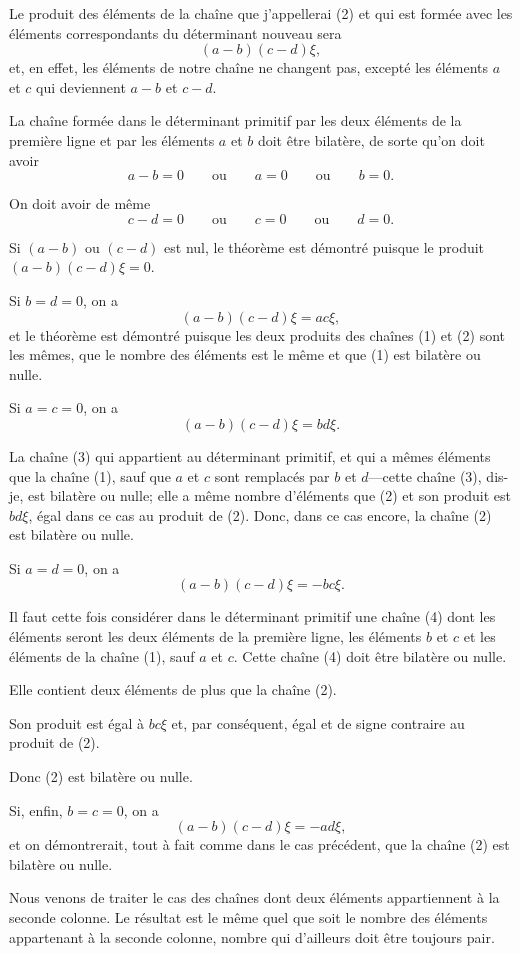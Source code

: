 \documentclass{article}
\begin{document}
Le produit des éléments de la chaîne que j'appellerai (2) et qui est formée avec les éléments correspondants du déterminant nouveau sera
\[ (a-b)(c-d)\xi, \]
et, en effet, les éléments de notre chaîne ne changent pas, excepté les éléments $a$ et $c$ qui deviennent $a-b$ et $c-d$.

La chaîne formée dans le déterminant primitif par les deux éléments de la première ligne et par les éléments $a$ et $b$ doit être bilatère, de sorte qu'on doit avoir
\[ a-b = 0 \qquad \text{ou} \qquad a = 0 \qquad \text{ou} \qquad b = 0. \]

On doit avoir de même
\[ c-d = 0 \qquad \text{ou} \qquad c = 0 \qquad \text{ou} \qquad d = 0. \]

Si $(a-b)$ ou $(c-d)$ est nul, le théorème est démontré puisque le produit $(a-b)(c-d)\xi = 0$.

Si $b = d = 0$, on a
\[ (a-b)(c-d)\xi = ac\xi, \]
et le théorème est démontré puisque les deux produits des chaînes (1) et (2) sont les mêmes, que le nombre des éléments est le même et que (1) est bilatère ou nulle.

Si $a = c = 0$, on a
\[ (a-b)(c-d)\xi = bd\xi. \]

La chaîne (3) qui appartient au déterminant primitif, et qui a mêmes éléments que la chaîne (1), sauf que $a$ et $c$ sont remplacés par $b$ et $d$---cette chaîne (3), dis-je, est bilatère ou nulle; elle a même nombre d'éléments que (2) et son produit est $bd\xi$, égal dans ce cas au produit de (2). Donc, dans ce cas encore, la chaîne (2) est bilatère ou nulle.

Si $a = d = 0$, on a
\[ (a-b)(c-d)\xi = -bc\xi. \]

Il faut cette fois considérer dans le déterminant primitif une
chaîne (4) dont les éléments seront les deux éléments de la première ligne, les éléments $b$ et $c$ et les éléments de la chaîne (1), sauf $a$ et $c$. Cette chaîne (4) doit être bilatère ou nulle.

Elle contient deux éléments de plus que la chaîne (2).

Son produit est égal à $bc\xi$ et, par conséquent, égal et de signe contraire au produit de (2).

Donc (2) est bilatère ou nulle.

Si, enfin, $b = c = 0$, on a
\[ (a-b)(c-d)\xi = -ad\xi, \]
et on démontrerait, tout à fait comme dans le cas précédent, que la chaîne (2) est bilatère ou nulle.

Nous venons de traiter le cas des chaînes dont deux éléments appartiennent à la seconde colonne. Le résultat est le même quel que soit le nombre des éléments appartenant à la seconde colonne, nombre qui d'ailleurs doit être toujours pair.
\end{document}
